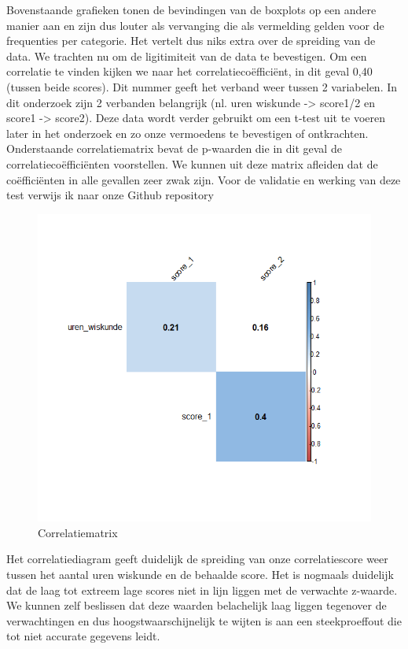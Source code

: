 \documentclass{hogent-article}
\begin{document}
	Bovenstaande grafieken tonen de bevindingen van de boxplots op een andere manier aan en zijn dus louter als vervanging die als vermelding gelden voor de frequenties per categorie. Het vertelt dus niks extra over de spreiding van de data.
	We trachten nu om de ligitimiteit van de data te bevestigen. Om een correlatie te vinden kijken we naar het correlatiecoëfficiënt, in dit geval 0,40 (tussen beide scores). Dit nummer geeft het verband weer tussen 2 variabelen. In dit onderzoek zijn 2 verbanden belangrijk (nl. uren wiskunde -> score1/2 en score1 -> score2). Deze data wordt verder gebruikt om een t-test uit te voeren later in het onderzoek en zo onze vermoedens te bevestigen of ontkrachten. Onderstaande correlatiematrix bevat de p-waarden die in dit geval de correlatiecoëfficiënten voorstellen. We kunnen uit deze matrix afleiden dat de coëfficiënten in alle gevallen zeer zwak zijn. Voor de validatie en werking van deze test verwijs ik naar onze Github repository \autocite{Decorte2019}
	\begin{figure}[H]
		\includegraphics[width=\linewidth]{img/corr.png}
		\caption{Correlatiematrix}
	\end{figure}
	
	Het correlatiediagram geeft duidelijk de spreiding van onze correlatiescore weer tussen het aantal uren wiskunde en de behaalde score. Het is nogmaals duidelijk dat de laag tot extreem lage scores niet in lijn liggen met de verwachte z-waarde. We kunnen zelf beslissen dat deze waarden belachelijk laag liggen tegenover de verwachtingen en dus hoogstwaarschijnelijk te wijten is aan een steekproeffout die tot niet accurate gegevens leidt.
	
\end{document}
